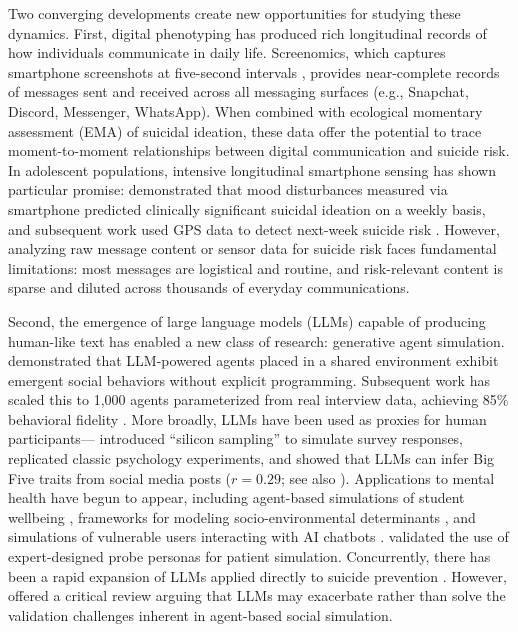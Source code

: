 \documentclass[review,12pt,authoryear]{elsarticle}
\begin{document}
Two converging developments create new opportunities for studying these dynamics. First, digital phenotyping \citep{insel2017digital} has produced rich longitudinal records of how individuals communicate in daily life. Screenomics, which captures smartphone screenshots at five-second intervals \citep{reeves2021screenomics}, provides near-complete records of messages sent and received across all messaging surfaces (e.g., Snapchat, Discord, Messenger, WhatsApp). When combined with ecological momentary assessment (EMA) of suicidal ideation, these data offer the potential to trace moment-to-moment relationships between digital communication and suicide risk. In adolescent populations, intensive longitudinal smartphone sensing has shown particular promise: \citet{auerbach2023intensive} demonstrated that mood disturbances measured via smartphone predicted clinically significant suicidal ideation on a weekly basis, and subsequent work used GPS data to detect next-week suicide risk \citep{auerbach2025gps}. However, analyzing raw message content or sensor data for suicide risk faces fundamental limitations: most messages are logistical and routine, and risk-relevant content is sparse and diluted across thousands of everyday communications.

Second, the emergence of large language models (LLMs) capable of producing human-like text has enabled a new class of research: generative agent simulation. \citet{park2023generative} demonstrated that LLM-powered agents placed in a shared environment exhibit emergent social behaviors without explicit programming. Subsequent work has scaled this to 1,000 agents parameterized from real interview data, achieving 85\% behavioral fidelity \citep{park2024generative}. More broadly, LLMs have been used as proxies for human participants---\citet{argyle2023silicon} introduced ``silicon sampling'' to simulate survey responses, \citet{aher2023turing} replicated classic psychology experiments, and \citet{peters2024llm} showed that LLMs can infer Big Five traits from social media posts ($r = 0.29$; see also \citealt{brickman2025llm}). Applications to mental health have begun to appear, including agent-based simulations of student wellbeing \citep{zhao2025studentlife}, frameworks for modeling socio-environmental determinants \citep{kambeitz2025modelling}, and simulations of vulnerable users interacting with AI chatbots \citep{qiu2025emoagent}. \citet{louie2024roleplay} validated the use of expert-designed probe personas for patient simulation. Concurrently, there has been a rapid expansion of LLMs applied directly to suicide prevention \citep{holmes2025scoping}. However, \citet{tornberg2025validation} offered a critical review arguing that LLMs may exacerbate rather than solve the validation challenges inherent in agent-based social simulation.
\end{document}
